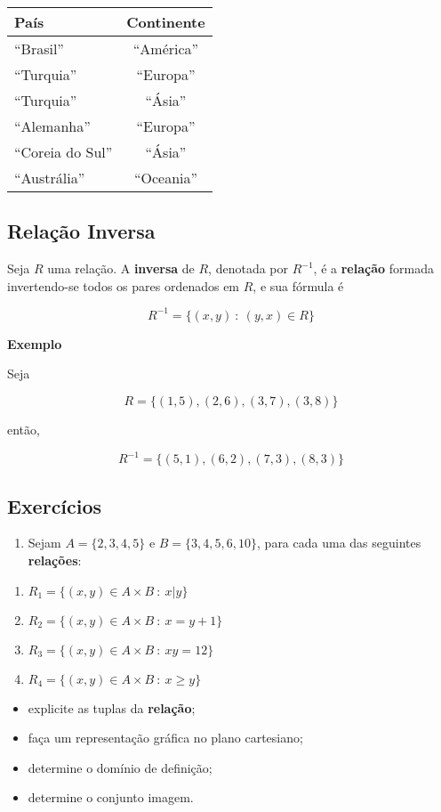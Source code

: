 \begin{longtable}[]{@{}lc@{}}
País & Continente\tabularnewline
\endhead
``Brasil'' & ``América''\tabularnewline
``Turquia'' & ``Europa''\tabularnewline
``Turquia'' & ``Ásia''\tabularnewline
``Alemanha'' & ``Europa''\tabularnewline
``Coreia do Sul'' & ``Ásia''\tabularnewline
``Austrália'' & ``Oceania''\tabularnewline
\end{longtable}

    \hypertarget{relauxe7uxe3o-inversa}{%
\subsection{Relação Inversa}\label{relauxe7uxe3o-inversa}}

Seja \(R\) uma relação. A \textbf{inversa} de \(R\), denotada por
\(R^{-1}\), é a \textbf{relação} formada invertendo-se todos os pares
ordenados em \(R\), e sua fórmula é

\[R^{-1}=\{(x,y)\ :\ (y,x)\in R\}\]

    \textbf{Exemplo}

Seja

\[R=\{(1,5),(2,6),(3,7),(3,8)\}\]

então,

\[R^{-1}=\{(5,1),(6,2),(7,3),(8,3)\}\]

\subsection{Exercícios}

\begin{enumerate}
\def\labelenumi{\arabic{enumi}.}
\item
  Sejam \(A=\{2,3,4,5\}\) e \(B=\{3,4,5,6,10\}\), para cada uma das
  seguintes \textbf{relações}:
\end{enumerate}

\begin{enumerate}
\item
  \(R_1=\{(x,y)\in A\times B \ :\ x|y\}\)
\item
  \(R_2=\{(x,y)\in A\times B \ :\ x=y+1\}\)
\item
  \(R_3=\{(x,y)\in A\times B \ :\ xy=12\}\)
\item
  \(R_4=\{(x,y)\in A\times B \ :\ x\geq y\}\)
\end{enumerate}

\begin{itemize}
\item
  explicite as tuplas da \textbf{relação};
\item
  faça um representação gráfica no plano cartesiano;
\item
  determine o domínio de definição;
\item
  determine o conjunto imagem.
\end{itemize}

